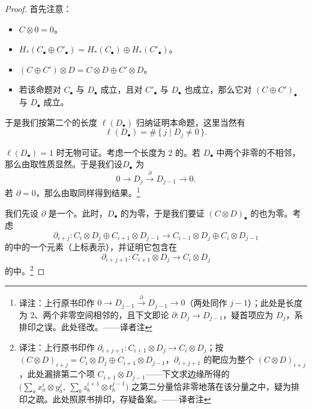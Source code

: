 \begin{proof}
首先注意：
\begin{itemize}
\item $C \otimes 0 = 0$。
\item $H_*(C_{\bullet} \oplus C'_{\bullet}) = H_*(C_{\bullet}) \oplus H_*(C'_{\bullet})$。
\item $(C \oplus C') \otimes D = C \otimes D \oplus C' \otimes D$。
\item 若该命题对 $C_{\bullet}$ 与 $D_{\bullet}$ 成立，且对 $C'_{\bullet}$ 与 $D_{\bullet}$ 也成立，那么它对 $(C \oplus C')_{\bullet}$ 与 $D_{\bullet}$ 成立。
\end{itemize}

于是我们按第二个\trChainComplex{}的长度 $\ell(D_{\bullet})$ 归纳证明本命题，这里当然有
\[
\ell(D_{\bullet}) = \#\,\{\, j \mid D_j \neq 0 \,\}.
\]

$\ell(D_{\bullet}) = 1$ 时无物可证。考虑一个长度为 $2$ 的\trComplex。若 $D_{\bullet}$ 中两个非零\trVectorSpace{}的\trIndex{}不相邻，那么由取\trDirectSum{}性质显然。于是我们设\trChainComplex $D_{\bullet}$ 为
\[
0 \longrightarrow D_j \xrightarrow{\ \partial\ } D_{j-1} \longrightarrow 0.
\]
若 $\partial = 0$，那么由取\trDirectSum{}同样得到结果。\footnote{译注：上行原书印作 $0 \to D_{j-1} \xrightarrow{\ \partial\ } D_{j-1} \to 0$（两处\trIndex{}同作 $j-1$）；此处是长度为 $2$、两个非零空间\trIndex{}相邻的\trComplex，且下文即论 $\partial : D_j \to D_{j-1}$，疑首项应为 $D_j$，系排印之误。此处径改。——译者注}

我们先设 $\partial$ 是一个\trIsomorphism。此时，\trChainComplex $D_{\bullet}$ 的\trHomology{}为零，于是我们要证 $(C \otimes D)_{\bullet}$ 的\trHomology{}也为零。考虑
\[
\partial_{i+j} : C_i \otimes D_j \oplus C_{i+1} \otimes D_{j-1} \longrightarrow C_{i-1} \otimes D_j \oplus C_i \otimes D_{j-1}
\]
的\trKernel{}中的一个元素（上标表示\trDegree），并证明它包含在
\[
\partial_{i+j+1} : C_{i+1} \otimes D_j \longrightarrow C_i \otimes D_j
\]
的\trImage{}中。\footnote{译注：上行原书印作 $\partial_{i+j+1} : C_{i+1} \otimes D_j \longrightarrow C_i \otimes D_j$；按 $(C \otimes D)_{i+j} = C_i \otimes D_j \oplus C_{i+1} \otimes D_{j-1}$，$\partial_{i+j+1}$ 的靶应为整个 $(C \otimes D)_{i+j}$，此处漏排第二个\trDirectSum{}项 $C_{i+1} \otimes D_{j-1}$——下文求边缘所得的 $\bigl( \sum_a x_a^i \otimes y_a^j,\ \sum_b z_b^{i+1} \otimes t_b^{j-1} \bigr)$ 之第二分量恰非零地落在该分量之中，疑为排印之疏。此处照原书排印，存疑备案。——译者注}


\end{proof}
